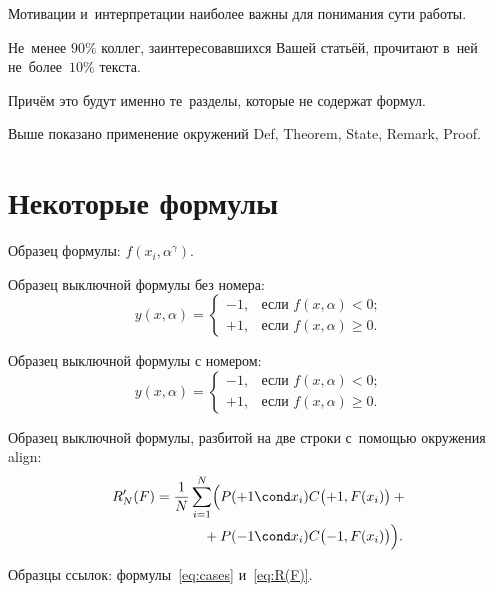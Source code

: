 \documentclass[12pt,twoside]{article}
\begin{document}
\begin{State}
    Мотивации и~интерпретации наиболее важны для понимания сути работы.
\end{State}

\begin{Theorem}
    Не~менее $90\%$ коллег, заинтересовавшихся Вашей статьёй,
    прочитают в~ней не~более~$10\%$ текста.
\end{Theorem}

\begin{Proof}
    Причём это будут именно те~разделы, которые не содержат формул.
\end{Proof}

\begin{Remark}
    Выше показано применение окружений
    Def, Theorem, State, Remark, Proof.
\end{Remark}

\section{Некоторые формулы}

Образец формулы: $f(x_i,\alpha^\gamma)$.

Образец выключной формулы без номера:
\[
    y(x,\alpha) =
    \begin{cases}
        -1, & \text{если } f(x,\alpha)<0;  \\
        +1, & \text{если } f(x,\alpha)\geq 0.
    \end{cases}
\]

Образец выключной формулы с номером:
\begin{equation}
\label{eq:cases}
    y(x,\alpha) =
    \begin{cases}
        -1, & \text{если } f(x,\alpha)<0;  \\
        +1, & \text{если } f(x,\alpha)\geq 0.
    \end{cases}
\end{equation}

Образец выключной формулы, разбитой на две строки с~помощью окружения align:
\begin{align}
    R'_N(F)
        = \frac1N \sum_{i=1}^N
        \Bigl(
            & P(+1\cond x_i) C\bigl(+1,F(x_i)\bigr)+{}
        \notag %
    \\ {}+{}
            & P(-1\cond x_i) C\bigl(-1,F(x_i)\bigr)
        \Bigr).
        \label{eq:R(F)}
\end{align}

Образцы ссылок: формулы~\eqref{eq:cases} и~\eqref{eq:R(F)}.
\end{document}
